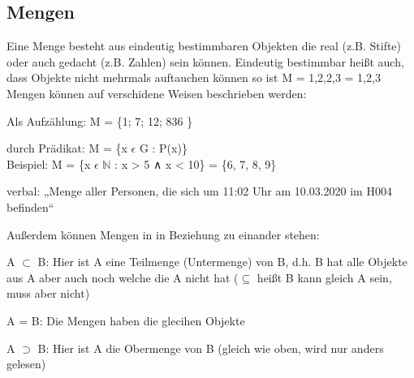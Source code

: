 \documentclass[a4paper,10pt]{scrartcl}
\begin{document}
        \subsection{Mengen}
        Eine Menge besteht aus eindeutig bestimmbaren Objekten die real (z.B. Stifte) oder auch gedacht (z.B. Zahlen) sein können. Eindeutig bestimmbar heißt auch,
        dass Objekte nicht mehrmals auftauchen können so ist M = {1,2,2,3} = {1,2,3}\\
        Mengen können auf verschidene Weisen beschrieben werden:
        \begin{description}
            \item Als Aufzählung: M = \{1; 7; 12; 836 \} 
            \item durch Prädikat: M = \{x $\epsilon$ G : P(x)\} \\ 
                Beispiel: M = \{x $\epsilon$ $\mathbb{N}$ : x > 5 ∧ x < 10\} = \{6, 7, 8, 9\}
            \item verbal: „Menge aller Personen, die sich um 11:02 Uhr am 10.03.2020 im H004 befinden“
        \end{description}
        Außerdem können Mengen in in Beziehung zu einander stehen:
        \begin{description}
            \item A $\subset$ B: Hier ist A eine Teilmenge (Untermenge) von B, d.h. B hat alle Objekte aus A aber auch noch welche die A nicht hat ($\subseteq$ heißt B kann gleich A sein, muss aber nicht)
            \item A = B: Die Mengen haben die glecihen Objekte
            \item A $\supset$ B: Hier ist A die Obermenge von B (gleich wie oben, wird nur anders gelesen)
        \end{description}
\end{document}
